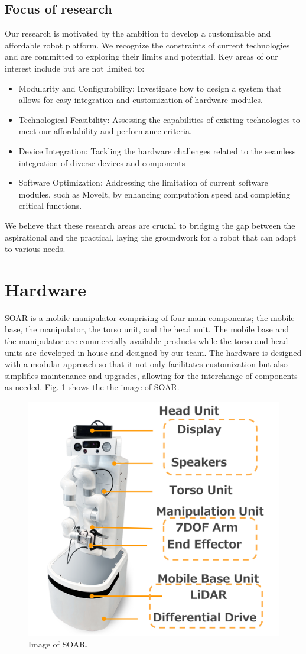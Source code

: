 \documentclass[runningheads,a4paper]{llncs}
\begin{document}
\subsection{Focus of research}
Our research is motivated by the ambition to develop a customizable and affordable robot platform.
We recognize the constraints of current technologies and are committed to exploring their limits and potential. Key areas of our interest include but are not limited to:
\begin{itemize}
	\item Modularity and Configurability: Investigate how to design a system that allows for easy integration and customization of hardware modules.
	\item Technological Feasibility: Assessing the capabilities of existing technologies to meet our affordability and performance criteria.
	\item Device Integration: Tackling the hardware challenges related to the seamless integration of diverse devices and components
	\item Software Optimization: Addressing the limitation of current software modules, such as MoveIt, by enhancing computation speed and completing critical functions.
\end{itemize}
We believe that these research areas are crucial to bridging the gap between the aspirational and the practical, laying the groundwork for a robot that can adapt to various needs.

\section{Hardware}
SOAR is a mobile manipulator comprising of four main components; the mobile base, the manipulator, the torso unit, and the head unit.
The mobile base and the manipulator are commercially available products while the torso and head units are developed in-house and designed by our team.
The hardware is designed with a modular approach so that it not only facilitates customization but also simplifies maintenance and upgrades, allowing for the interchange of components as needed.
Fig. \ref{fig:soar_overview} shows the the image of SOAR.

\begin{figure}[tbp]
	\centering
	\includegraphics[width=0.5\linewidth]{images/soar_overview.png}
	\caption{Image of SOAR.}
	\label{fig:soar_overview}
\end{figure}
\end{document}
